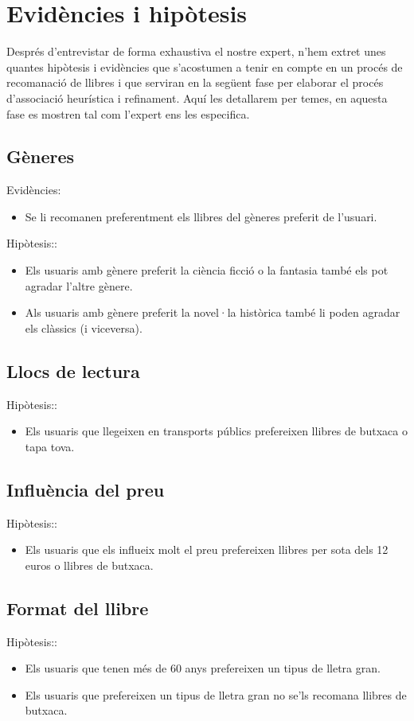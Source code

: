 \section{Evidències i hipòtesis}

Després d'entrevistar de forma exhaustiva el nostre expert, n'hem extret unes quantes hipòtesis i evidències que s'acostumen a tenir en compte en un procés de recomanació de llibres i que serviran en la següent fase per elaborar el procés d'associació heurística i refinament. Aquí les detallarem per temes, en aquesta fase es mostren tal com l'expert ens les especifica.

\subsection{Gèneres}
Evidències:
\begin{itemize}
  \item Se li recomanen preferentment els llibres del gèneres preferit de l'usuari.
\end{itemize}
Hipòtesis::
\begin{itemize}
  \item Els usuaris amb gènere preferit la ciència ficció o la fantasia també els pot agradar l'altre gènere.
  \item Als usuaris amb gènere preferit la novel·la històrica també li poden agradar els clàssics (i viceversa).
\end{itemize}

\subsection{Llocs de lectura}
Hipòtesis::
\begin{itemize}
  \item Els usuaris que llegeixen en transports públics prefereixen llibres de butxaca o tapa tova.
\end{itemize}

\subsection{Influència del preu}
Hipòtesis::
\begin{itemize}
  \item Els usuaris que els influeix molt el preu prefereixen llibres per sota dels 12 euros o llibres de butxaca.
\end{itemize}

\subsection{Format del llibre}
Hipòtesis::
\begin{itemize}
  \item Els usuaris que tenen més de 60 anys prefereixen un tipus de lletra gran.
  \item Els usuaris que prefereixen un tipus de lletra gran no se'ls recomana llibres de butxaca.
\end{itemize}

